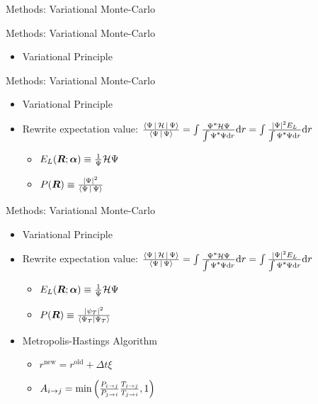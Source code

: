 \documentclass[10pt, t, xcolor=dvipsnames]{beamer}
\begin{document}
{{\begin{frame}[fragile]{Methods: Variational Monte-Carlo}
\end{frame}

\begin{frame}[fragile]{Methods: Variational Monte-Carlo}
    \begin{itemize}
        \item Variational Principle
    \end{itemize}
\end{frame}

\begin{frame}[fragile]{Methods: Variational Monte-Carlo}
    \begin{itemize}
        \item Variational Principle
        \item Rewrite expectation value:
            $\frac{\Braket{\Psi|\mathcal{H}|\Psi}}{\Braket{\Psi|\Psi}} = \int
            \frac{\cnj{\Psi}\mathcal{H}\Psi}{\int \cnj{\Psi}\Psi \md r} \md r
            = \int \frac{\abs{\Psi}^2E_L}{\int \cnj{\Psi}\Psi \md r} \md r$
            \begin{itemize}
                \item $E_L(\bm{{R}};\bm{{\alpha}}) \equiv \frac{1}{\Psi}\mathcal{H}\Psi$
                \item $P(\bm{{R}}) \equiv \frac{\abs{\Psi}^2}{\Braket{\Psi|\Psi}}$
            \end{itemize}
    \end{itemize}
\end{frame}

\begin{frame}[fragile]{Methods: Variational Monte-Carlo}
    \begin{itemize}
        \item Variational Principle
        \item Rewrite expectation value:
            $\frac{\Braket{\Psi|\mathcal{H}|\Psi}}{\Braket{\Psi|\Psi}} = \int
            \frac{\cnj{\Psi}\mathcal{H}\Psi}{\int \cnj{\Psi}\Psi \md r} \md r
            = \int \frac{\abs{\Psi}^2E_L}{\int \cnj{\Psi}\Psi \md r} \md r$
            \begin{itemize}
                \item $E_L(\bm{{R}};\bm{{\alpha}}) \equiv \frac{1}{\Psi}\mathcal{H}\Psi$
                \item $P(\bm{{R}}) \equiv \frac{\abs{\psi_T}^2}{\bra{\Psi_T}\ket{\Psi_T}}$
            \end{itemize}
        \item Metropolis-Hastings Algorithm
            \begin{itemize}
                \item $r^{\text{new}} = r^{\text{old}} + \Delta t \xi$
                \item $A_{i\rightarrow j} =
                    \text{min}\left(\frac{P_{i\rightarrow j}}{P_{j\rightarrow i}}
                    \frac{T_{i\rightarrow j}}{T_{j\rightarrow i}} ,1\right)$
            \end{itemize}
    \end{itemize}
\end{frame}

}}
\end{document}
